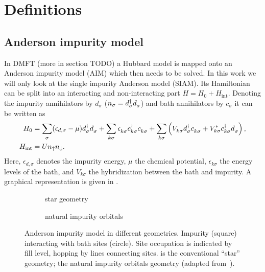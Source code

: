 
\chapter{Definitions}

\section{Anderson impurity model}

In DMFT (more in section TODO) a Hubbard model is mapped onto an Anderson impurity model (AIM)
which then needs to be solved.
In this work we will only look at the single impurity Anderson model (SIAM).
Its Hamiltonian can be split into an interacting and non-interacting part
$H = H_0 + H_\mathrm{int}$.
Denoting the impurity annihilators by $d_\sigma$ ($n_\sigma = d^\dag_\sigma d^{\pdag}_\sigma$)
and bath annihilators by $c_\sigma$
it can be written as
\begin{align}
    H_0
     & =
    \sum_{\pk\sigma} (\epsilon_{d,\sigma} - \mu) d^\dag_{\pk\sigma} d^{\pdag}_{\pk\sigma}
    +
    \sum_{k\sigma} \epsilon_{k\sigma}^{\pdag} c^\dag_{k\sigma} c^{\pdag}_{k\sigma}
    +
    \sum_{k\sigma} \left(V^{\ps}_{k\sigma} d^\dag_{\vphantom{k}\sigma} c^{\pdag}_{k\sigma}
    + V_{k\sigma}^* c^\dag_{k\sigma} d^{\pdag}_{\vphantom{k}\sigma} \right),
    \\
    H_\mathrm{int}
     & =
    U n_\uparrow n_\downarrow.
\end{align}
Here,
$\epsilon_{d,\sigma}$ denotes the impurity energy,
$\mu$ the chemical potential,
$\epsilon_{k\sigma}$ the energy levels of the bath,
and $V_{k\sigma}$ the hybridization between the bath and impurity.
A graphical representation is given in .

\begin{figure}[ht]
    \centering
    \savebox{\imagebox}{} %
    \begin{subfigure}{0.45\textwidth}
        \centering
        \usebox{\imagebox}
        \caption{star geometry}
        \label{subfig:geometry-star}
    \end{subfigure}
    \begin{subfigure}{0.45\textwidth}
        \centering
        \raisebox{\dimexpr0.5\ht\imagebox-0.5\height}
        {
            
        }
        \caption{natural impurity orbitals}
        \label{subfig:geometry-natural-impurity-orbitals}
    \end{subfigure}
    \caption{
        Anderson impurity model in different geometries.
        Impurity (square) interacting with bath sites (circle).
        Site occupation is indicated by fill level, hopping by lines connecting sites.
         is the conventional ``star'' geometry;
         the natural impurity orbitals geometry
        (adapted from~\cite{Lu2019}).
    }
\end{figure}

